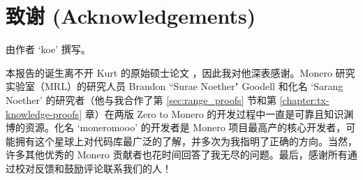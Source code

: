 \section{致谢 (Acknowledgements)}
\label{sec:acknowledgements}

由作者 `koe' 撰写。

本报告的诞生离不开 Kurt 的原始硕士论文 \cite{kurt-original}，因此我对他深表感谢。Monero 研究实验室（MRL）的研究人员 Brandon ``Surae Noether" Goodell 和化名 `Sarang Noether' 的研究者（他与我合作了第 \ref{sec:range_proofs} 节和第 \ref{chapter:tx-knowledge-proofs} 章）在两版 Zero to Monero 的开发过程中一直是可靠且知识渊博的资源。化名 `moneromooo' 的开发者是 Monero 项目最高产的核心开发者，可能拥有这个星球上对代码库最广泛的了解，并多次为我指明了正确的方向。当然，许多其他优秀的 Monero 贡献者也花时间回答了我无尽的问题。最后，感谢所有通过校对反馈和鼓励评论联系我们的人！
